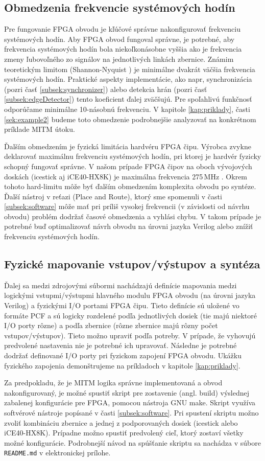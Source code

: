 \subsection{Obmedzenia frekvencie systémových hodín} \label{subsek:sysFreq}
Pre fungovanie FPGA obvodu je kľúčové správne nakonfigurovať frekvenciu systémových hodín. Aby FPGA obvod fungoval správne, je potrebné, aby frekvencia systémových hodín bola niekoľkonásobne vyššia ako je frekvencia zmeny ľubovoľného zo signálov na jednotlivých linkách zbernice. Známim teoretickým limitom (Shannon-Nyquist \cite{shannonNyquist}) je minimálne dvakrát väčšia frekvencia systémových hodín. Praktické aspekty implementácie, ako napr, synchronizácia (pozri časť \ref{subsek:synchronizer}) alebo detekcia hrán (pozri časť \ref{subsek:edgeDetector}) tento koeficient ďalej zväčšujú. Pre spoľahlivú funkčnosť odporúčame minimálne 10-násobnú frekvenciu. V kapitole \ref{kap:priklady}, časti \ref{sek:example2} budeme toto obmedzenie podrobnejšie analyzovať na konkrétnom príklade MITM útoku.

Ďalším obmedzením je fyzická limitácia hardvéru FPGA čipu. Výrobca zvykne deklarovať maximálnu frekvenciu systémových hodín, pri ktorej je hardvér fyzicky schopný fungovať správne. V našom prípade FPGA čipov na oboch vývojových doskách (icestick aj iCE40-HX8K) je maximálna frekvencia 275\,MHz \cite{lphxFamily}. Okrem tohoto hard-limitu môže byť ďalším obmedzením komplexita obvodu po syntéze. Ďalší nástroj v reťazi (Place and Route), ktorý sme spomenuli v časti \ref{subsek:software} môže mať pri príliš vysokej frekvencii (v závislosti od návrhu obvodu) problém dodržať časové obmedzenia a vyhlási chybu. V takom prípade je potrebné buď optimalizovať návrh obvodu na úrovni jazyka Verilog alebo znížiť frekvenciu systémových hodín.

\subsection{Fyzické mapovanie vstupov/výstupov a syntéza}
Ďalej sa medzi zdrojovými súbormi nachádzajú definície mapovania medzi logickými vstupmi/výstupmi hlavného modulu FPGA obvodu (na úrovni jazyka Verilog) a fyzickými I/O portami FPGA čipu. Tieto definície sú uložené vo formáte PCF a sú logicky rozdelené podľa jednotlivých dosiek (tie majú niektoré I/O porty rôzne) a podľa zbernice (rôzne zbernice majú rôzny počet vstupov/výstupov). Tieto možno upraviť podľa potreby. V prípade, že vyhovujú predvolené nastavenia nie je potrebné ich upravovať. Následne je potrebné dodržať definované I/O porty pri fyzickom zapojení FPGA obvodu. Ukážku fyzického zapojenia demonštrujeme na príkladoch v kapitole \ref{kap:priklady}. 

Za predpokladu, že je MITM logika správne implementovaná a obvod nakonfigurovaný, je možné spustiť skript pre zostavenie (angl. build) výslednej zabalenej konfigurácie pre FPGA, pomocou nástroja GNU make. Skript využíva softvérové nástroje popísané v časti \ref{subsek:software}. Pri spustení skriptu možno zvoliť kombináciu zbernice a jednej z podporovaných dosiek (icestick alebo iCE40-HX8K). Prípadne možno spustiť predvolený cieľ, ktorý zostaví všetky možné konfigurácie. Podrobnejší návod na spúšťanie skriptu sa nachádza v súbore \texttt{README.md} v elektronickej prílohe.